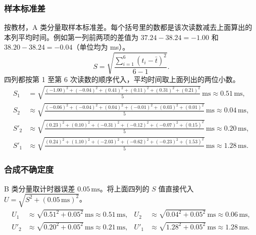 \documentclass[UTF8,fontset=fandol,11pt,a4paper]{ctexart}
\newcommand{\ms}{\,\mathrm{ms}}
\begin{document}
\subsubsection*{样本标准差}
按教材，A 类分量取样本标准差。每个括号里的数都是该次读数减去上面算出的本列平均时间。例如第一列前两项的差值为 $37.24-38.24=-1.00$ 和 $38.20-38.24=-0.04$（单位均为 ms）。
\[
 S=\sqrt{\frac{\sum_{i=1}^{6}(t_i-\bar t)^2}{6-1}}.
\]
四列都按第 1 至第 6 次读数的顺序代入，平均时间取上面列出的两位小数。
\begin{align*}
 S_1&=\sqrt{\frac{(-1.00)^2+(-0.04)^2+(0.41)^2+(0.11)^2+(0.31)^2+(0.21)^2}{5}}\,\mathrm{ms}
 \approx0.51\ms,\\
 S_2&\approx\sqrt{\frac{(-0.06)^2+(-0.04)^2+(0.04)^2+(-0.01)^2+(0.03)^2+(0.01)^2}{5}}\,\mathrm{ms}
 \approx0.04\ms,\\
 S'_2&\approx\sqrt{\frac{(0.23)^2+(0.10)^2+(-0.31)^2+(-0.12)^2+(-0.07)^2+(0.15)^2}{5}}\,\mathrm{ms}
 \approx0.20\ms,\\
 S'_1&\approx\sqrt{\frac{(0.24)^2+(1.10)^2+(-2.03)^2+(-0.62)^2+(-0.23)^2+(1.53)^2}{5}}\,\mathrm{ms}
 \approx1.28\ms .
\end{align*}
\subsubsection*{合成不确定度}
B 类分量取计时器误差 $0.05\ms$。将上面四列的 $S$ 值直接代入 $U=\sqrt{S^2+(0.05\ms)^2}$。
\begin{align*}
 U_1&\approx\sqrt{0.51^2+0.05^2}\,\mathrm{ms}\approx0.51\ms,&
 U_2&\approx\sqrt{0.04^2+0.05^2}\,\mathrm{ms}\approx0.06\ms,\\
 U'_2&\approx\sqrt{0.20^2+0.05^2}\,\mathrm{ms}\approx0.21\ms,&
 U'_1&\approx\sqrt{1.28^2+0.05^2}\,\mathrm{ms}\approx1.28\ms .
\end{align*}
\newpage
\end{document}
